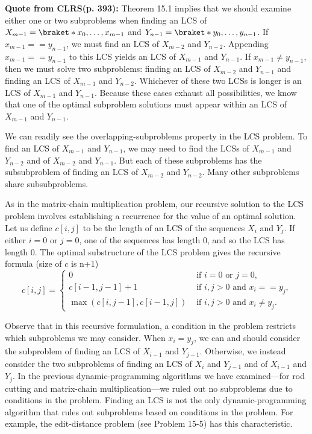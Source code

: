 \begin{itemize}
  \textbf{Quote from CLRS(p. 393):} Theorem 15.1 implies that we should
  examine either one or two subproblems when finding an LCS of
  $X_{m-1}=\braket*{x_0,\ldots,x_{m-1}}$ and
  $Y_{n-1}=\braket*{y_0,\ldots,y_{n-1}}$. If $x_{m-1}==y_{n-1}$, we must
  find an LCS of $X_{m-2}$ and $Y_{n-2}$.  Appending $x_{m-1}==y_{n-1}$ to
  this LCS yields an LCS of $X_{m-1}$ and $Y_{n-1}$. If $x_{m-1}\neq
  y_{n-1}$, then we must solve two subproblems: finding an LCS of $X_{m-2}$
  and $Y_{n-1}$ and finding an LCS of $X_{m-1}$ and $Y_{n-2}$.  Whichever of
  these two LCSs is longer is an LCS of $X_{m-1}$ and $Y_{n-1}$. Because
  these cases exhaust all possibilities, we know that one of the optimal
  subproblem solutions must appear within an LCS of $X_{m-1}$ and $Y_{n-1}$.

  We can readily see the overlapping-subproblems property in the LCS
  problem. To find an LCS of $X_{m-1}$ and $Y_{n-1}$, we may need to find
  the LCSs of $X_{m-1}$ and $Y_{n-2}$ and of $X_{m-2}$ and $Y_{n-1}$. But
  each of these subproblems has the subsubproblem of finding an LCS of
  $X_{m-2}$ and $Y_{n-2}$. Many other subproblems share subsubproblems.

  As in the matrix-chain multiplication problem, our recursive solution to
  the LCS problem involves establishing a recurrence for the value of an
  optimal solution. Let us define $c[i,j]$ to be the length of an LCS of the
  sequences $X_i$ and $Y_j$. If either $i=0$ or $j=0$, one of the sequences
  has length $0$, and so the LCS has length $0$. The optimal substructure of
  the LCS problem gives the recursive formula (size of $c$ is n+1)
  \begin{equation}\label{eqCLRSC15N9}
  c[i,j] = 
  \begin{cases}
  0            &\text{ if $i=0$ or $j=0$,}\\
  c[i-1,j-1]+1 &\text{ if $i,j>0$ and $x_i==y_j$,}\\
  \max(c[i,j-1],c[i-1,j]) &\text{ if $i,j>0$ and $x_i\neq y_j$.}
  \end{cases}
  \end{equation}
  
  Observe that in this recursive formulation, a condition in the problem
  restricts which subproblems we may consider. When $x_i=y_j$, we can and
  should consider the subproblem of finding an LCS of $X_{i-1}$ and
  $Y_{j-1}$.  Otherwise, we instead consider the two subproblems of finding
  an LCS of $X_i$ and $Y_{j-1}$ and of $X_{i-1}$ and $Y_j$. In the previous
  dynamic-programming algorithms we have examined---for rod cutting and
  matrix-chain multiplication---we ruled out no subproblems due to
  conditions in the problem. Finding an LCS is not the only
  dynamic-programming algorithm that rules out subproblems based on
  conditions in the problem.  For example, the edit-distance problem (see
  Problem 15-5) has this characteristic.


\end{itemize}
